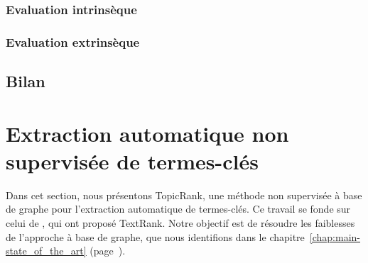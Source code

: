       \subsubsection{Evaluation intrinsèque}
      \label{subsubsec:main-automatic_keyphrase_annotation-keyphrase_candidate_selection-evaluation-intrinsic_evaluation}

      \subsubsection{Evaluation extrinsèque}
      \label{subsubsec:main-automatic_keyphrase_annotation-keyphrase_candidate_selection-evaluation-extrinsic_evaluation}

    \subsection{Bilan}
    \label{subsec:main-automatic_keyphrase_annotation-keyphrase_candidate_selection-conclusion}


  \section{Extraction automatique non supervisée de termes-clés}
  \label{sec:main-automatic_keyphrase_annotation-unsupervised_automatic_keyphrase_extraction}
    Dans cet section, nous présentons TopicRank, une méthode non supervisée à
    base de graphe pour l'extraction automatique de termes-clés. Ce travail se
    fonde sur celui de , qui ont proposé TextRank.
    Notre objectif est de résoudre les faiblesses de l'approche à base de
    graphe, que nous identifions dans le
    chapitre~\ref{chap:main-state_of_the_art}
    (page~\pageref{chap:main-state_of_the_art}).

